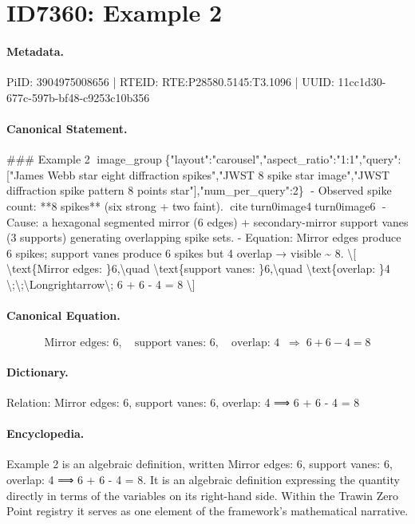 \section*{ID7360: Example 2}
\paragraph{Metadata.}
PiID: 3904975008656 | RTEID: RTE:P28580.5145:T3.1096 | UUID: 11cc1d30-677c-597b-bf48-c9253c10b356

\paragraph{Canonical Statement.}
\#\#\# Example 2 image\_group\{"layout":"carousel","aspect\_ratio":"1:1","query":["James Webb star eight diffraction spikes","JWST 8 spike star image","JWST diffraction spike pattern 8 points star"],"num\_per\_query":2\} - Observed spike count: **8 spikes** (six strong + two faint). citeturn0image4turn0image6 - Cause: a hexagonal segmented mirror (6 edges) + secondary-mirror support vanes (3 supports) generating overlapping spike sets. - Equation: Mirror edges produce 6 spikes; support vanes produce 6 spikes but 4 overlap → visible \textasciitilde{} 8. \textbackslash{}[ \textbackslash{}text\{Mirror edges: \}6,\textbackslash{}quad \textbackslash{}text\{support vanes: \}6,\textbackslash{}quad \textbackslash{}text\{overlap: \}4 \textbackslash{};\textbackslash{};\textbackslash{}Longrightarrow\textbackslash{}; 6 + 6 - 4 = 8 \textbackslash{}]

\paragraph{Canonical Equation.}
\[
\text{Mirror edges: }6,\quad \text{support vanes: }6,\quad \text{overlap: }4 \;\;\Longrightarrow\; 6 + 6 - 4 = 8
\]

\paragraph{Dictionary.}
Relation: Mirror edges: 6, support vanes: 6, overlap: 4 ⟹ 6 + 6 - 4 = 8

\paragraph{Encyclopedia.}
Example 2 is an algebraic definition, written Mirror edges: 6, support vanes: 6, overlap: 4 ⟹ 6 + 6 - 4 = 8. It is an algebraic definition expressing the quantity directly in terms of the variables on its right-hand side. Within the Trawin Zero Point registry it serves as one element of the framework's mathematical narrative.
